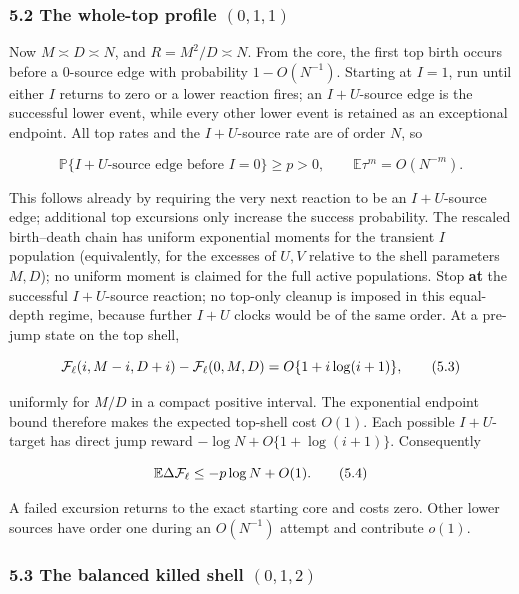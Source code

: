 \subsubsection{\texorpdfstring{5.2 The whole-top profile
\((0,1,1)\)}{5.2 The whole-top profile (0,1,1)}}

Now \(M\asymp D\asymp N\), and \(R=M^2/D\asymp N\). From the core, the
first top birth occurs before a \(0\)-source edge with probability
\(1-O(N^{-1})\). Starting at \(I=1\), run until either \(I\) returns to
zero or a lower reaction fires; an \(I+U\)-source edge is the successful
lower event, while every other lower event is retained as an exceptional
endpoint. All top rates and the \(I+U\)-source rate are of order \(N\),
so

\[
 {\mathbb P}\{I+U\text{-source edge before }I=0\}\ge p>0,
 \qquad {\mathbb E}\tau^m=O(N^{-m}).                  \tag{5.2}
\]

This follows already by requiring the very next reaction to be an
\(I+U\)-source edge; additional top excursions only increase the success
probability. The rescaled birth--death chain has uniform exponential
moments for the transient \(I\) population (equivalently, for the
excesses of \(U,V\) relative to the shell parameters \(M,D\)); no
uniform moment is claimed for the full active populations. Stop
\textbf{at} the successful \(I+U\)-source reaction; no top-only cleanup
is imposed in this equal-depth regime, because further \(I+U\) clocks
would be of the same order. At a pre-jump state on the top shell,

\[
 {\cal F}_\ell(i,M-i,D+i)-{\cal F}_\ell(0,M,D)
 =O\{1+i\log(i+1)\},                                  \tag{5.3}
\]

uniformly for \(M/D\) in a compact positive interval. The exponential
endpoint bound therefore makes the expected top-shell cost \(O(1)\).
Each possible \(I+U\)-target has direct jump reward
\(-\log N+O\{1+\log(i+1)\}\). Consequently

\[
 {\mathbb E}\Delta{\cal F}_\ell\le-p\log N+O(1).      \tag{5.4}
\]

A failed excursion returns to the exact starting core and costs zero.
Other lower sources have order one during an \(O(N^{-1})\) attempt and
contribute \(o(1)\).

\subsubsection{\texorpdfstring{5.3 The balanced killed shell
\((0,1,2)\)}{5.3 The balanced killed shell (0,1,2)}}

